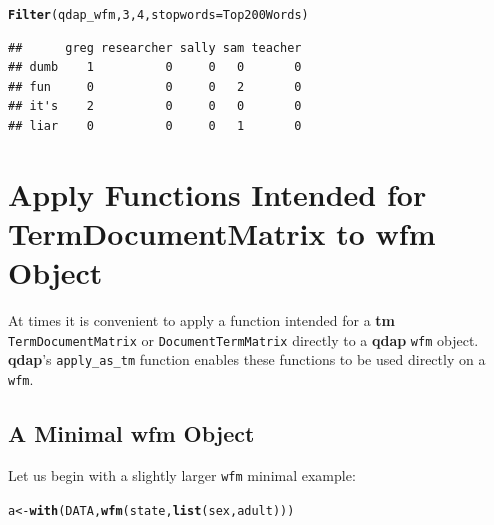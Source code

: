 \documentclass{article}\usepackage[]{graphicx}\usepackage[]{color}
\makeatletter
\newcommand{\hlnum}[1]{\textcolor[rgb]{0.686,0.059,0.569}{#1}}%
\newcommand{\hlstd}[1]{\textcolor[rgb]{0.345,0.345,0.345}{#1}}%
\newcommand{\hlkwb}[1]{\textcolor[rgb]{0.69,0.353,0.396}{#1}}%
\newcommand{\hlkwc}[1]{\textcolor[rgb]{0.333,0.667,0.333}{#1}}%
\newcommand{\hlkwd}[1]{\textcolor[rgb]{0.737,0.353,0.396}{\textbf{#1}}}%
\newenvironment{kframe}{%
 \def\at@end@of@kframe{}%
 \ifinner\ifhmode%
  \def\at@end@of@kframe{\end{minipage}}%
  \begin{minipage}{\columnwidth}%
 \fi\fi%
 \def\FrameCommand##1{\hskip\@totalleftmargin \hskip-\fboxsep
 \colorbox{shadecolor}{##1}\hskip-\fboxsep
     \hskip-\linewidth \hskip-\@totalleftmargin \hskip\columnwidth}%
 \MakeFramed {\advance\hsize-\width
   \@totalleftmargin\z@ \linewidth\hsize
   \@setminipage}}%
 {\par\unskip\endMakeFramed%
 \at@end@of@kframe}
\newenvironment{knitrout}{}{} %
\makeatother
\begin{document}
\begin{knitrout}
\color{fgcolor}\begin{kframe}
\begin{alltt}
\hlkwd{Filter}\hlstd{(qdap_wfm,} \hlnum{3}\hlstd{,} \hlnum{4}\hlstd{,} \hlkwc{stopwords} \hlstd{= Top200Words)}
\end{alltt}
\end{kframe}
\end{knitrout}


\begin{knitrout}
\color{fgcolor}\begin{kframe}
\begin{verbatim}
##      greg researcher sally sam teacher
## dumb    1          0     0   0       0
## fun     0          0     0   2       0
## it's    2          0     0   0       0
## liar    0          0     0   1       0
\end{verbatim}
\end{kframe}
\end{knitrout}



\section{Apply Functions Intended for TermDocumentMatrix to wfm Object}

\hspace{.4cm} At times it is convenient to apply a function intended for a \textbf{tm} \texttt{TermDocumentMatrix} or \texttt{DocumentTermMatrix} directly to a \textbf{qdap} \texttt{wfm} object.  \textbf{qdap}'s \texttt{apply\_as\_tm} function enables these functions to be used directly on a \texttt{wfm}.

\subsection{A Minimal wfm Object}

\hspace{.4cm} Let us begin with a slightly larger \texttt{wfm} minimal example:

\begin{knitrout}
\color{fgcolor}\begin{kframe}
\begin{alltt}
\hlstd{a} \hlkwb{<-} \hlkwd{with}\hlstd{(DATA,} \hlkwd{wfm}\hlstd{(state,} \hlkwd{list}\hlstd{(sex, adult)))}
\end{alltt}
\end{kframe}
\end{knitrout}
\end{document}
